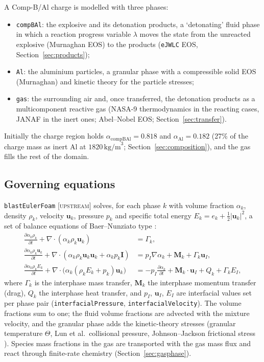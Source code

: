 \documentclass{article}
\newcommand{\up}{\textsc{[upstream]}}
\begin{document}
A Comp-B/Al charge is modelled with three phases:
\begin{itemize}
    \item \texttt{compBAl}: the explosive and its detonation products, a `detonating' fluid phase in which a reaction progress variable $\lambda$ moves the state from the unreacted explosive (Murnaghan EOS) to the products (\texttt{eJWLC} EOS, Section~\ref{sec:products});
    \item \texttt{Al}: the aluminium particles, a granular phase with a compressible solid EOS (Murnaghan) and kinetic theory for the particle stresses;
    \item \texttt{gas}: the surrounding air and, once transferred, the detonation products as a multicomponent reactive gas (NASA-9 thermodynamics in the reacting cases, JANAF in the inert ones; Abel--Nobel EOS; Section~\ref{sec:transfer}).
\end{itemize}
Initially the charge region holds $\alpha_\text{compBAl} = 0.818$ and $\alpha_\text{Al} = 0.182$ (27\% of the charge mass as inert Al at $1820\,\text{kg/m}^3$; Section~\ref{sec:composition}), and the gas fills the rest of the domain.

\subsection{Governing equations}
\label{sec:equations}

\texttt{blastEulerFoam} \up{} solves, for each phase $k$ with volume fraction $\alpha_k$, density $\rho_k$, velocity $\mathbf{u}_k$, pressure $p_k$ and specific total energy $E_k = e_k + \tfrac12|\mathbf{u}_k|^2$, a set of balance equations of Baer--Nunziato type \cite{baer1986,saurel1999}:
\begin{align}
    \frac{\partial \alpha_k\rho_k}{\partial t} + \nabla\cdot(\alpha_k\rho_k\mathbf{u}_k) &= \Gamma_k, \\
    \frac{\partial \alpha_k\rho_k\mathbf{u}_k}{\partial t} + \nabla\cdot(\alpha_k\rho_k\mathbf{u}_k\mathbf{u}_k + \alpha_k p_k \mathbf{I}) &= p_I\nabla\alpha_k + \mathbf{M}_k + \Gamma_k\mathbf{u}_I, \\
    \frac{\partial \alpha_k\rho_k E_k}{\partial t} + \nabla\cdot\big(\alpha_k(\rho_k E_k + p_k)\mathbf{u}_k\big) &= -p_I\frac{\partial\alpha_k}{\partial t} + \mathbf{M}_k\cdot\mathbf{u}_I + Q_k + \Gamma_k E_I,
\end{align}
where $\Gamma_k$ is the interphase mass transfer, $\mathbf{M}_k$ the interphase momentum transfer (drag), $Q_k$ the interphase heat transfer, and $p_I$, $\mathbf{u}_I$, $E_I$ are interfacial values set per phase pair (\texttt{interfacialPressure}, \texttt{interfacialVelocity}). The volume fractions sum to one; the fluid volume fractions are advected with the mixture velocity, and the granular phase adds the kinetic-theory stresses (granular temperature $\Theta$, Lun et al.\ collisional pressure, Johnson--Jackson frictional stress \cite{gidaspow}). Species mass fractions in the gas are transported with the gas mass flux and react through finite-rate chemistry (Section~\ref{sec:gasphase}).
\end{document}
